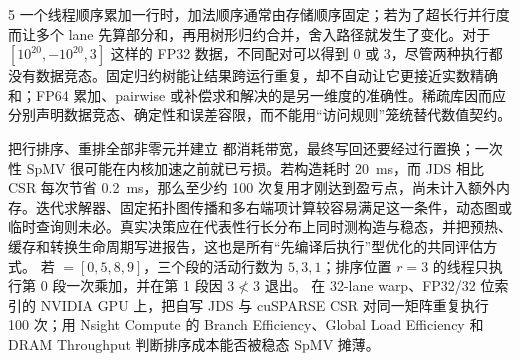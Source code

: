 \begin{solutionexercise}{5}
一个线程顺序累加一行时，加法顺序通常由存储顺序固定；若为了超长行并行度而让多个 lane 先算部分和，再用树形归约合并，舍入路径就发生了变化。对于 $[10^{20},-10^{20},3]$ 这样的 FP32 数据，不同配对可以得到 0 或 3，尽管两种执行都没有数据竞态。固定归约树能让结果跨运行重复，却不自动让它更接近实数精确和；FP64 累加、pairwise 或补偿求和解决的是另一维度的准确性。稀疏库因而应分别声明数据竞态、确定性和误差容限，而不能用“访问规则”笼统替代数值契约。

把行排序、重排全部非零元并建立  都消耗带宽，最终写回还要经过行置换；一次性 SpMV 很可能在内核加速之前就已亏损。若构造耗时 20~ms，而 JDS 相比 CSR 每次节省 0.2~ms，那么至少约 100 次复用才刚达到盈亏点，尚未计入额外内存。迭代求解器、固定拓扑图传播和多右端项计算较容易满足这一条件，动态图或临时查询则未必。真实决策应在代表性行长分布上同时测构造与稳态，并把预热、缓存和转换生命周期写进报告，这也是所有“先编译后执行”型优化的共同评估方式。
\variantheading 若  $=[0,5,8,9]$，三个段的活动行数为 $5,3,1$；排序位置 $r=3$ 的线程只执行第 0 段一次乘加，并在第 1 段因 $3\not<3$ 退出。
\practiceheading 在 32-lane warp、FP32/32 位索引的 NVIDIA GPU 上，把自写 JDS 与 cuSPARSE CSR 对同一矩阵重复执行 100 次；用 Nsight Compute 的 Branch Efficiency、Global Load Efficiency 和 DRAM Throughput 判断排序成本能否被稳态 SpMV 摊薄。
\end{solutionexercise}

